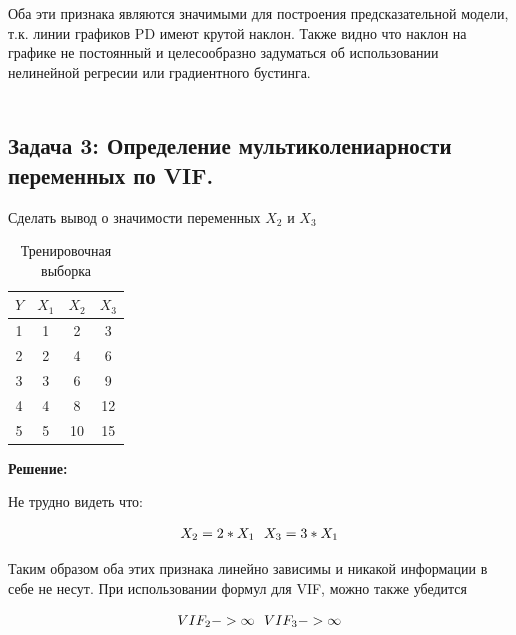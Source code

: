 \begin{itemize}
Оба эти признака являются значимыми для построения предсказательной модели, т.к. линии графиков PD имеют крутой наклон. Также видно что наклон на графике не постоянный и целесообразно задуматься об использовании нелинейной регресии или градиентного бустинга. \\\\

\subsection*{Задача 3: Определение мультиколениарности переменных по VIF.}

Сделать вывод о значимости переменных \(X_{2}\) и \(X_{3}\) \\

\begin{table}[h!]
\centering
\caption{Тренировочная выборка}
\begin{tabular}{|c|c|c|c|}
\hline
\textbf{\(Y\)} & \textbf{\( X_1 \)} & \textbf{\( X_2 \)} & \textbf{\( X_3 \)} \\ \hline
1                  & 1                  & 2                  & 3                  \\ \hline
2                  & 2                  & 4                  & 6                  \\ \hline
3                  & 3                  & 6                  & 9                  \\ \hline
4                  & 4                  & 8                  & 12                 \\ \hline
5                  & 5                  & 10                 & 15                 \\ \hline
\end{tabular}
\label{tab:example_vif}
\end{table}

\textbf{Решение:}

Не трудно видеть что:

\begin{align}
X_{2} = 2*X_{1} \text{\space\space} X_{3} = 3*X_{1}
\end{align}

Таким образом оба этих признака линейно зависимы и никакой информации в себе не несут. При использовании формул для VIF, можно также убедится

\begin{align}
VIF_{2} -> \infty \text{\space\space} VIF_{3}-> \infty
\end{align}

\end{itemize}
